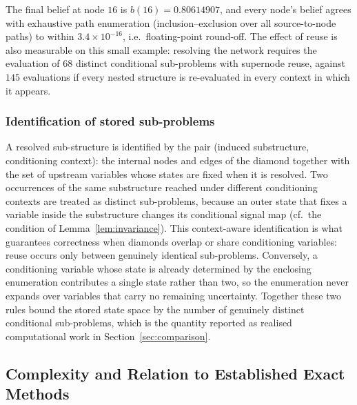 \documentclass[preprint,12pt]{elsarticle}
\theoremstyle{definition}
\begin{document}
The final belief at node $16$ is $b(16)=0.80614907$, and every node's belief agrees with exhaustive path
enumeration (inclusion--exclusion over all source-to-node paths) to within $3.4\times10^{-16}$, i.e.\
floating-point round-off. The effect of reuse is also measurable on this small example: resolving the
network requires the evaluation of $68$ distinct conditional sub-problems with supernode reuse, against
$145$ evaluations if every nested structure is re-evaluated in every context in which it appears.

\subsubsection{Identification of stored sub-problems}\label{sec:identification}

A resolved sub-structure is identified by the pair (induced substructure, conditioning context): the
internal nodes and edges of the diamond together with the set of upstream variables whose states are
fixed when it is resolved. Two occurrences of the same substructure reached under different conditioning
contexts are treated as distinct sub-problems, because an outer state that fixes a variable inside the
substructure changes its conditional signal map (cf.\ the condition of Lemma~\ref{lem:invariance}). This
context-aware identification is what guarantees correctness when diamonds overlap or share conditioning
variables: reuse occurs only between genuinely identical sub-problems. Conversely, a conditioning
variable whose state is already determined by the enclosing enumeration contributes a single state rather
than two, so the enumeration never expands over variables that carry no remaining uncertainty. Together
these two rules bound the stored state space by the number of genuinely distinct conditional
sub-problems, which is the quantity reported as realised computational work in
Section~\ref{sec:comparison}.

\subsection{Complexity and Relation to Established Exact Methods}\label{sec:complexity}
\end{document}

